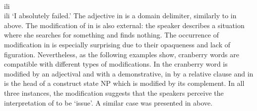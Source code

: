 \documentclass[output=paper]{langsci/langscibook}
\begin{document}
\ili{} \ili{} \ili{} \ili{} \ili{} \ili{} \ili{} \ili{} \ili{} \ili{} \ili{} \ili{} \ili{}\textbf{}\ili{} \ili{}\textbf{}\ili{} \ili{} \ili{}\textbf{}\ili{} \ili{} \ili{}\underline{}\ili{} \ili{} \ili{}\\ili{}\\ili{}
\ili{} \ili{} \ili{} \ili{} \ili{} \ili{} \ili{} \ili{} \ili{}\glt\ili{} \ili{}`I\ili{} absolutely\ili{} failed\ili{}.\ili{}'\ili{}
\ili{} \ili{} \ili{} \ili{} \ili{}\z\ili{}
\ili{}
The\ili{} adjective\ili{} \ili{}\hebgloss{}\ili{} in\ili{} \ili{}\ili{} is\ili{} a\ili{} domain\ili{} delimiter\ili{},\ili{} similarly\ili{} to\ili{} \ili{}\hebgloss{}\ili{} in\ili{} \ili{}\ili{} above\ili{}.\ili{} The\ili{} modification\ili{} of\ili{} \ili{}\hebgloss{}\ili{} in\ili{} \ili{}\ili{} is\ili{} also\ili{} external\ili{}:\ili{} the\ili{} speaker\ili{} describes\ili{} a\ili{} situation\ili{} where\ili{} she\ili{} searches\ili{} for\ili{} something\ili{} and\ili{} finds\ili{} \ili{}\emph{}\ili{} nothing\ili{}.\ili{}
\ili{}
The\ili{} occurrence\ili{} of\ili{} modification\ili{} in\ili{} \ili{}\textbf{}\ili{} is\ili{} especially\ili{} surprising\ili{} due\ili{} to\ili{} their\ili{} opaqueness\ili{} and\ili{} lack\ili{} of\ili{} figuration\ili{}.\ili{} Nevertheless\ili{},\ili{} as\ili{} the\ili{} following\ili{} examples\ili{} show\ili{},\ili{} cranberry\ili{} words\ili{} are\ili{} compatible\ili{} with\ili{} different\ili{} types\ili{} of\ili{} modifications\ili{}.\ili{} In\ili{} \ili{}\ili{} the\ili{} cranberry\ili{} word\ili{} \ili{}\textnl{}\ili{} is\ili{} modified\ili{} by\ili{} an\ili{} adjectival\ili{} \ili{}\isi{}\ili{} and\ili{} with\ili{} a\ili{} demonstrative\ili{},\ili{} in\ili{} \ili{}\ili{} by\ili{} a\ili{} relative\ili{} clause\ili{} and\ili{} in\ili{} \ili{}\ili{} \ili{}\textnl{}\ili{} is\ili{} the\ili{} head\ili{} of\ili{} a\ili{} construct\ili{} state\ili{} NP\ili{} which\ili{} is\ili{} modified\ili{} by\ili{} its\ili{} complement\ili{}.\ili{} In\ili{} all\ili{} three\ili{} instances\ili{},\ili{} the\ili{} modification\ili{} suggests\ili{} that\ili{} the\ili{} speakers\ili{} perceive\ili{} the\ili{} interpretation\ili{} of\ili{} \ili{}\textnl{}\ili{} to\ili{} be\ili{} \ili{}`issue\ili{}'\ili{}.\ili{} A\ili{} similar\ili{} case\ili{} was\ili{} presented\ili{} in\ili{} \ili{}\ili{} above\ili{}.\ili{}
\end{document}
